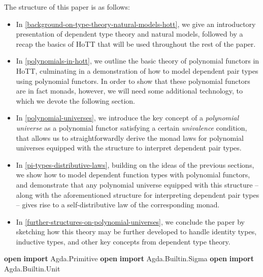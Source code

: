 \documentclass[
  11pt,
  oneside,
  article]{memoir}
\newenvironment{Shaded}{}{}
\newcommand{\KeywordTok}[1]{\textcolor[rgb]{0.00,0.44,0.13}{\textbf{#1}}}
\newcommand{\NormalTok}[1]{#1}
\newcommand{\OtherTok}[1]{\textcolor[rgb]{0.00,0.44,0.13}{#1}}
\providecommand{\tightlist}{%
  \setlength{\itemsep}{0pt}\setlength{\parskip}{0pt}}
\theoremstyle{definition}
\theoremstyle{plain}
\newcommand{\0}{\textsf{0}}
\newcommand{\1}{\tn{\textsf{1}}}
\begin{document}
The structure of this paper is as follows:

\begin{itemize}
\tightlist
\item
  In \cref{background-on-type-theory-natural-models-hott}, we give an introductory presentation of dependent type
  theory and natural models, followed by a recap the basics of HoTT that
  will be used throughout the rest of the paper.
\item
  In \cref{polynomials-in-hott}, we outline the basic theory of polynomial functors in
  HoTT, culminating in a demonstration of how to model dependent pair
  types using polynomial functors. In order to show that these
  polynomial functors are in fact monads, however, we will need some
  additional technology, to which we devote the following section.
\item
  In \cref{polynomial-universes}, we introduce the key concept of a \emph{polynomial
  universe} as a polynomial functor satisfying a certain
  \emph{univalence} condition, that allows us to straightforwardly
  derive the monad laws for polynomial universes equipped with the
  structure to interpret dependent pair types.
\item
  In \cref{pi-types-distributive-laws}, building on the ideas of the previous sections, we show
  how to model dependent function types with polynomial functors, and
  demonstrate that any polynomial universe equipped with this structure
  -- along with the aforementioned structure for interpreting dependent
  pair types -- gives rise to a self-distributive law of the
  corresponding monad.
\item
  In \cref{further-structures-on-polynomial-universes}, we conclude the paper by sketching how this theory may
  be further developed to handle identity types, inductive types, and
  other key concepts from dependent type theory.
\end{itemize}

\begin{Shaded}
\begin{Highlighting}[]
\KeywordTok{open} \KeywordTok{import}\NormalTok{ Agda}\OtherTok{.}\NormalTok{Primitive}
\KeywordTok{open} \KeywordTok{import}\NormalTok{ Agda}\OtherTok{.}\NormalTok{Builtin}\OtherTok{.}\NormalTok{Sigma}
\KeywordTok{open} \KeywordTok{import}\NormalTok{ Agda}\OtherTok{.}\NormalTok{Builtin}\OtherTok{.}\NormalTok{Unit}
\end{Highlighting}
\end{Shaded}
\end{document}

